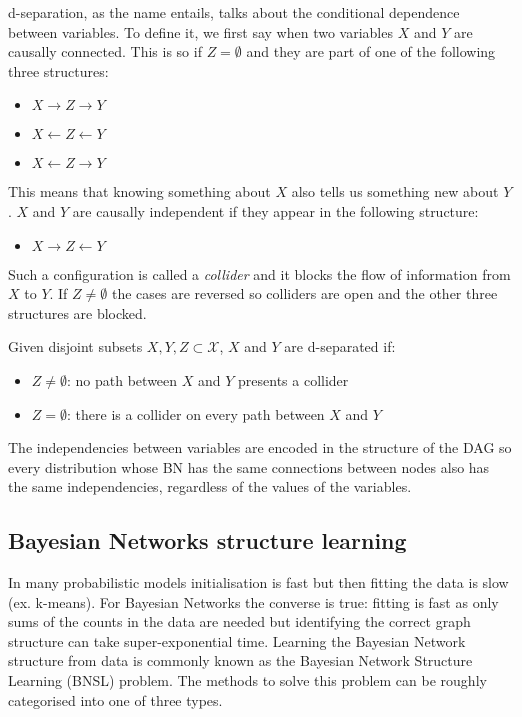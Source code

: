 d-separation, as the name entails, talks about the conditional dependence between variables.
To define it, we first say when two variables $X$ and $Y$ are causally connected.
This is so if $Z = \emptyset$ and they are part of one of the following three structures:
\begin{itemize}
  \item $X \rightarrow Z \rightarrow Y$
  \item $X \leftarrow Z \leftarrow Y$
  \item $X \leftarrow Z \rightarrow Y$
\end{itemize}
This means that knowing something about $X$ also tells us something new about $Y$.
$X$ and $Y$ are causally independent if they appear in the following structure:
\begin{itemize}
  \item $X \rightarrow Z \leftarrow  Y$
\end{itemize}
Such a configuration is called a \textit{collider} and it blocks the flow of information from $X$ to $Y$.
If $Z \neq \emptyset$ the cases are reversed so colliders are open and the other three structures are blocked.
\begin{definition}
	Given disjoint subsets $X, Y, Z \subset \mathcal{X}$, $X$ and $Y$ are d-separated if:
	\begin{itemize}
		\item $Z \neq \emptyset$: no path between $X$ and $Y$ presents a collider
		\item $Z = \emptyset$: there is a collider on every path between $X$ and $Y$
	\end{itemize}
\end{definition}

The independencies between variables are encoded in the structure of the DAG so every distribution whose BN has the same connections between nodes also has the same independencies, regardless of the values of the variables.

\subsection{Bayesian Networks structure learning} \label{subsec:bnstructurelearning}
In many probabilistic models initialisation is fast but then fitting the data is slow (ex. k-means).
For Bayesian Networks the converse is true: fitting is fast as only sums of the counts in the data are needed but identifying the correct graph structure can take super-exponential time.
Learning the Bayesian Network structure from data is commonly known as the Bayesian Network Structure Learning (BNSL) problem.
The methods to solve this problem can be roughly categorised into one of three types.

